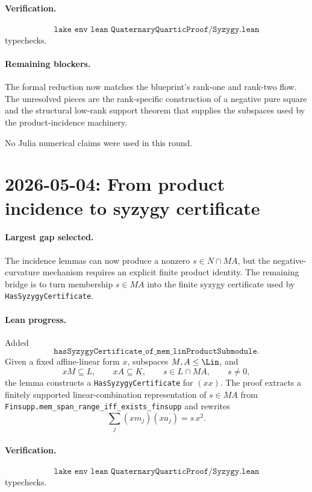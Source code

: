 \documentclass[11pt]{article}
\begin{document}
\paragraph{Verification.}
\[
\texttt{lake env lean QuaternaryQuarticProof/Syzygy.lean}
\]
typechecks.

\paragraph{Remaining blockers.}
The formal reduction now matches the blueprint's rank-one and rank-two flow.
The unresolved pieces are the rank-specific construction of a negative pure
square and the structural low-rank support theorem that supplies the
subspaces used by the product-incidence machinery.

No Julia numerical claims were used in this round.

\section*{2026-05-04: From product incidence to syzygy certificate}

\paragraph{Largest gap selected.}
The incidence lemmas can now produce a nonzero \(s\in N\cap MA\), but the
negative-curvature mechanism requires an explicit finite product identity.
The remaining bridge is to turn membership \(s\in MA\) into the finite
syzygy certificate used by \texttt{HasSyzygyCertificate}.

\paragraph{Lean progress.}
Added
\[
\texttt{hasSyzygyCertificate\_of\_mem\_linProductSubmodule}.
\]
Given a fixed affine-linear form \(x\), subspaces \(M,A\le\Lin\), and
\[
xM\subseteq L,\qquad xA\subseteq K,\qquad s\in L\cap MA,\qquad s\neq0,
\]
the lemma constructs a \texttt{HasSyzygyCertificate} for
\((xx)\).  The proof extracts a finitely supported linear-combination
representation of \(s\in MA\) from
\texttt{Finsupp.mem\_span\_range\_iff\_exists\_finsupp} and rewrites
\[
\sum_j (xm_j)(x a_j)=s\,x^2.
\]

\paragraph{Verification.}
\[
\texttt{lake env lean QuaternaryQuarticProof/Syzygy.lean}
\]
typechecks.
\end{document}
